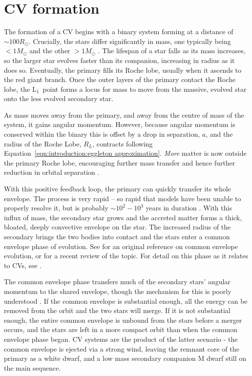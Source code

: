 \section{CV formation}
\label{sect:introduction:formation of CVs}

The formation of a CV begins with a binary system forming at a distance of $\sim 100{R_\odot}$. Crucially, the stars differ significantly in mass, one typically being $<1{M_\odot}$ and the other $>1{M_\odot}$ \citep{Ritter2012}. The lifespan of a star falls as its mass increases, so the larger star evolves faster than its companion, increasing in radius as it does so. Eventually, the primary fills its Roche lobe, usually when it ascends to the red giant branch.
Once the outer layers of the primary contact the Roche lobe, the $\mathrm L_1$\ point forms a locus for mass to move from the massive, evolved star onto the less evolved secondary star.

As mass moves away from the primary, and away from the centre of mass of the system, it gains angular momentum. However, because angular momentum is conserved within the binary this is offset by a drop in separation, $a$, and the radius of the Roche Lobe, ${R_L}$, contracts following Equation~\ref{eqn:introduction:eggleton approximation}. \textit{More} matter is now outside the primary Roche lobe, encouraging further mass transfer and hence further reduction in orbital separation \citep{Ritter2008}.

With this positive feedback loop, the primary can quickly transfer its whole envelope. The process is very rapid -- so rapid that models have been unable to properly resolve it, but is probably $\sim 10^2 - 10^3$ years in duration \citep{Ritter2012}. With this influx of mass, the secondary star grows and the accreted matter forms a thick, bloated, deeply convective envelope on the star. The increased radius of the secondary brings the two bodies into contact \citep{Ritter2008} and the stars enter a common envelope phase of evolution. See \citet{paczynski1976} for an original reference on common envelope evolution, or \citet{ivanova2020} for a recent review of the topic. For detail on this phase as it relates to CVs, see \citet{taam1978, webbink1984, zorotovic2010, passy2011}.

The common envelope phase transfers much of the secondary stars' angular momentum to the shared envelope, though the mechanism for this is poorly understood \citep{demarco2011}.
If the common envelope is substantial enough, all the energy can be removed from the orbit and the two stars will merge.
If it is not substantial enough, the entire common envelope is unbound from the stars before a merger occurs, and the stars are left in a more compact orbit than when the common envelope phase began.
CV systems are the product of the latter scenario - the common envelope is ejected via a strong wind, leaving the remnant core of the primary as a white dwarf, and a low mass secondary companion M dwarf still on the main sequence.

